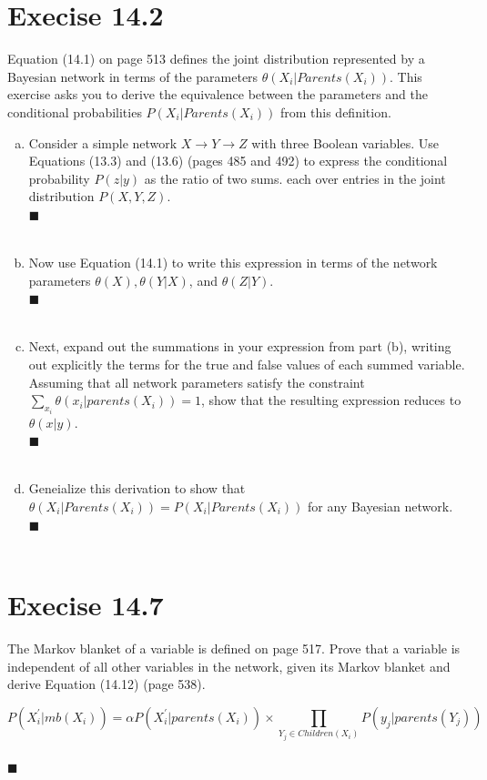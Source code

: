 \documentclass{article}
\newcommand{\solution}[1]{~\\ $\blacksquare$ \sffamily\upshape\selectfont #1
\normalfont ~\\~ }
\begin{document}
\section{Execise 14.2}
Equation (14.1) on page 513 defines the joint distribution represented
by a Bayesian network in terms of the parameters $\theta
(X_i|Parents(X_i))$. This exercise asks you to derive the 
equivalence between the parameters and the conditional probabilities
$P(X_i|Parents(X_i))$ from this definition.
\begin{enumerate}[a.]
\item Consider a simple network $X \rightarrow Y \rightarrow Z$ with three
  Boolean variables. Use Equations (13.3) and (13.6) (pages 485 and
  492) to express the conditional probability $P(z|y)$ as the ratio of
  two sums. each over entries in the joint distribution $P(X,Y,Z)$. 
  \solution{}
\item Now use Equation (14.1) to write this expression in terms of the
  network parameters $\theta (X), \theta (Y|X)$, and $\theta(Z|Y)$.
  \solution{}
\item Next, expand out the summations in your expression from part
  (b), writing out explicitly the terms for the true and false values
  of each summed variable. Assuming that all network parameters
  satisfy the constraint $\sum_{x_i}\theta (x_i|parents(X_i))=1$, show
  that the resulting expression reduces to $\theta(x|y)$. 
  \solution{}
\item Geneialize this derivation to show that $\theta
  (X_i|Parents(X_i))=P(X_i|Parents(X_i))$ for any Bayesian network.
  \solution{}
\end{enumerate}

\section{Execise 14.7}
The Markov blanket of a variable is defined on page 517. Prove that a
variable is independent of all other variables in the network, given
its Markov blanket and derive Equation (14.12) (page 538).

\[ P(X_i^{\prime}|mb(X_i))=\alpha P(X_i^{\prime}|parents(X_i))\times
\prod_{Y_j\in Children(X_i)}P(y_j|parents(Y_j)) \]
\solution{}
\end{document}
